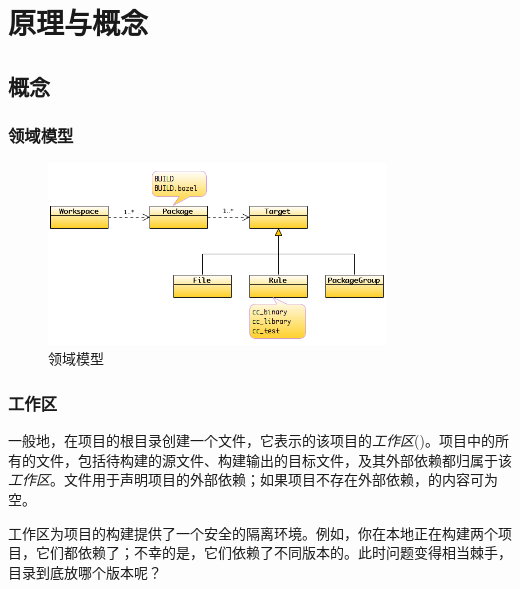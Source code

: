 \begin{savequote}[45mm]
\end{savequote}

\chapter{原理与概念} 
\label{ch:bazel-concept}

\section{概念}

\begin{content}

\subsection{领域模型}

\begin{figure}[H]
\centering
\includegraphics[width=0.8\textwidth]{figures/bazel-domain-model.png}
\caption{领域模型} 
 \label{fig:bazel-domain-model}
\end{figure}

\subsection{工作区}

一般地，在项目的根目录创建一个文件，它表示的该项目的\emph{工作区}()。项目中的所有的文件，包括待构建的源文件、构建输出的目标文件，及其外部依赖都归属于该\emph{工作区}。文件用于声明项目的外部依赖；如果项目不存在外部依赖，的内容可为空。

工作区为项目的构建提供了一个安全的隔离环境。例如，你在本地正在构建两个\cpp{}项目，它们都依赖了；不幸的是，它们依赖了不同版本的。此时问题变得相当棘手，目录到底放哪个版本呢？


\end{content}
